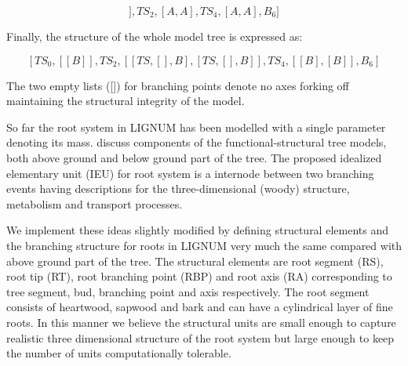 \begin{equation}
[TS_0,[[B]],TS_2,[A,A],TS_4,[A,A],B_6]
\end{equation}

Finally, the structure of the whole model tree is expressed as:

\begin{equation}\label{eq:tree}
[TS_0,[[B]],TS_2,[[TS,[],B],[TS,[],B]],TS_4,[[B],[B]],B_6]
\end{equation}

The two empty  lists ([]) for branching points  denote no axes forking
off maintaining the structural integrity of the model.

So  far the  root system  in LIGNUM  has been  modelled with  a single
parameter denoting  its mass.  \citet{sievanen:00}  discuss components
of the functional-structural tree  models, both above ground and below
ground part of the tree.  The proposed idealized elementary unit (IEU)
for root  system is  a internode between  two branching  events having
descriptions for  the three-dimensional (woody)  structure, metabolism
and transport processes.

We  implement these  ideas  slightly modified  by defining  structural
elements and the branching structure for roots in LIGNUM very much the
same  compared with  above ground  part of  the tree.   The structural
elements are  root segment (RS),  root tip (RT), root  branching point
(RBP) and root axis (RA) corresponding to tree segment, bud, branching
point and axis respectively.   The root segment consists of heartwood,
sapwood and bark  and can have a cylindrical layer  of fine roots.  In
this  manner we  believe  the  structural units  are  small enough  to
capture realistic  three dimensional structure of the  root system but
large enough to keep the number of units computationally tolerable.

